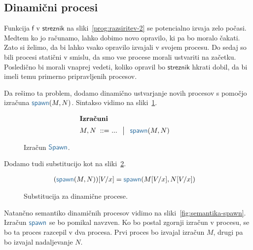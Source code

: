 \subsection{Dinamični procesi}

Funkcija $\mathsf{f}$ v $\mathsf{streznik}$ na sliki~\ref{prog:razsiritev-2} se potencialno izvaja zelo počasi. Medtem ko jo računamo, lahko dobimo novo opravilo, ki pa bo moralo čakati. Zato si želimo, da bi lahko vsako opravilo izvajali v svojem procesu. 
Do sedaj so bili procesi statični v smislu, da smo vse procese morali ustvariti na začetku.
Posledično bi morali vnaprej vedeti, koliko opravil bo $\mathsf{streznik}$ hkrati dobil, da bi imeli temu primerno pripravljenih procesov.

Da rešimo ta problem, dodamo dinamično ustvarjanje novih procesov s pomočjo izračuna $\tmspawn{M}{N}$. Sintakso vidimo na sliki~\ref{fig:izračun-spawn}. 

\begin{figure}[H]	
	\centering
	\small
	\begin{align*}
	\shortintertext{\textbf{Izračuni}}
	M, N
	\bnfis & ... \,\bnfor\! \tmspawn{M}{N}
	\end{align*}
	
	\caption{Izračun $\tmkw{Spawn}$.}
	\label{fig:izračun-spawn}
\end{figure}

Dodamo tudi substitucijo kot na sliki~\ref{fig:substitucija-spawn}.

\begin{figure}[H]
	\centering
	\small
	\begin{align*}
		(\tmspawn{M}{N})[V/x] &= \tmspawn{M[V/x]}{N[V/x]}
	\end{align*}
	\caption{Substitucija za dinamične procese.}
	\label{fig:substitucija-spawn}
\end{figure}

Natančno semantiko dinamičnih procesov vidimo na sliki~\ref{fig:semantika-spawn}. Izračun $\tmkw{spawn}$ se bo pomikal navzven. Ko bo postal zgornji izračun v procesu, se bo ta proces razcepil v dva procesa. 
Prvi proces bo izvajal izračun $M$, drugi pa bo izvajal nadaljevanje $N$.

